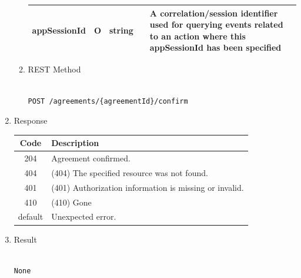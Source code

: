 \begin{enumerate}
\begin{enumerate}
\begin{table}[H]
\begin{center}
\begin{tabular}{|p{3cm}|l|p{3cm}|p{3cm}|p{4cm}|}
appSessionId	& O	& 	string				&		&	A correlation/session identifier used for querying events related to an action where this appSessionId has been specified 	\\ 
\hline

\end{tabular}
\end{center}

\end{table}

\item REST Method

\begin{tcolorbox}[boxrule=0pt, frame empty]
\begin{verbatim} 

POST /agreements/{agreementId}/confirm

\end{verbatim}
\end{tcolorbox}

\end{enumerate}

\item Response

\begin{table}[H]
\footnotesize

\begin{center}
\begin{tabular}{|c|l|} 
\hline
\rowcolor{lightgray}	Code 		& 	Description \\
\hline
204	 		&	Agreement confirmed. \\
\hline
404			&	(404) The specified resource was not found. \\
\hline
401			&	(401) Authorization information is missing or invalid. \\
\hline
410			&	(410) Gone \\
\hline
default		&	Unexpected error. \\
\hline
\end{tabular}
\end{center}

\end{table}

\item Result

\begin{tcolorbox}[boxrule=0pt, frame empty]
\begin{verbatim}

None

\end{verbatim}
\end{tcolorbox}


\end{enumerate}
